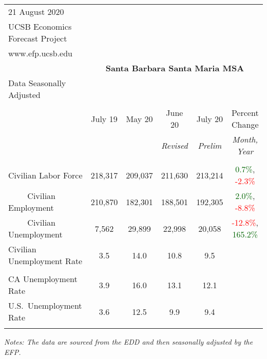 \documentclass[12pt]{article}
\begin{document}
\begin{table}
\begin{tabular}{|l|c|c|c|c|c|}
\multicolumn{1}{l}{\small 21 August 2020} & \multicolumn{5}{c}{} \\
\multicolumn{1}{l}{\small UCSB Economics Forecast Project} & \multicolumn{5}{c}{} \\
\multicolumn{1}{l}{\small www.efp.ucsb.edu} & \multicolumn{5}{c}{} \\
\multicolumn{1}{c}{} & \multicolumn{5}{c}{\large \textbf{Santa Barbara Santa Maria MSA}} \\
\multicolumn{1}{l}{\small Data Seasonally Adjusted} & \multicolumn{5}{c}{} \\ \hline \hline
& & & & & \\
 & July 19 & May 20 & June 20 & July 20 & Percent Change \\
 & & & \small \textit{Revised} & \small \textit{Prelim} & \small \textit{Month, Year} \\ \hline
& & & & & \\
Civilian Labor Force & 218,317 & 209,037 & 211,630 & 213,214 & \textcolor{darkgreen}{0.7\%}, \textcolor{red}{-2.3\%} \\
$\qquad$ \small Civilian Employment & 210,870 & 182,301 & 188,501 & 192,305 & \textcolor{darkgreen}{2.0\%}, \textcolor{red}{-8.8\%} \\
$\qquad$ \small Civilian Unemployment & 7,562 & 29,899 & 22,998 & 20,058 & \textcolor{red}{-12.8\%}, \textcolor{darkgreen}{165.2\%} \\
Civilian Unemployment Rate & 3.5 & 14.0 & 10.8 & 9.5 & \\
& & & & & \\
CA Unemployment Rate & 3.9 & 16.0 & 13.1 & 12.1 & \\
U.S.\ Unemployment Rate & 3.6 & 12.5 & 9.9 & 9.4 & \\
& & & & & \\ \hline \hline
\end{tabular}
\par
\vspace{.5em}
\footnotesize
\textit{Notes: The data are sourced from the EDD and then seasonally adjusted by the EFP.}
\end{table}
\end{document}

